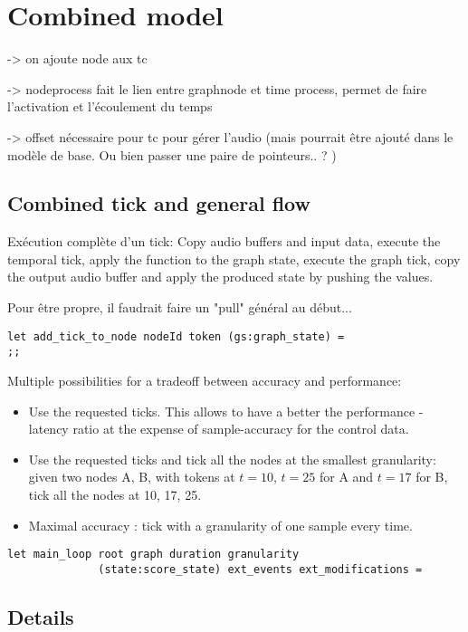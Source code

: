 \documentclass[applsci,article,submit,moreauthors,pdftex,10pt,a4paper]{mdpi}
\begin{document}
\section{Combined model}
-> on ajoute node aux tc

-> nodeprocess fait le lien entre graphnode et time process, permet de faire l'activation et l'écoulement du temps

-> offset nécessaire pour tc pour gérer l'audio (mais pourrait être ajouté dans le modèle de base. Ou bien passer une paire de pointeurs.. ? )

\subsection{Combined tick and general flow}
Exécution complète d'un tick: 
Copy audio buffers and input data, execute the temporal tick, apply the function to the graph state, execute the graph tick, copy the output audio buffer and apply the produced state by pushing the values.


Pour être propre, il faudrait faire un "pull" général au début...

\begin{lstlisting}
let add_tick_to_node nodeId token (gs:graph_state) =
;;
\end{lstlisting}

Multiple possibilities for a tradeoff between accuracy and performance: 
\begin{itemize}
	\item Use the requested ticks. This allows to have a better the performance - latency ratio at the expense of sample-accuracy for the control data.
	\item Use the requested ticks and tick all the nodes at the smallest granularity: 
	given two nodes A, B, with tokens at $t=10$, $t=25$ for A and $t=17$ for B, tick all the nodes at 10, 17, 25.
	\item Maximal accuracy : tick with a granularity of one sample every time.
\end{itemize}



\begin{lstlisting}
let main_loop root graph duration granularity 
			  (state:score_state) ext_events ext_modifications =

\end{lstlisting}



\subsection{Details}
\end{document}
